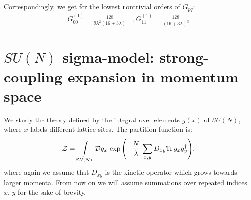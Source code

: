 \documentclass[twocolumn,showpacs,preprintnumbers,superscriptaddress,amsmath,floatfix,amssymb,secnumarabic]{revtex4}
\newcommand{\lr}[1]{ \left( #1 \right) }
\newcommand{\tr}{ {\rm Tr} \, }
\newcommand{\expa}[1]{ \exp{\left( #1 \right)} }
\begin{document}
Correspondingly, we get for the lowest nontrivial orders of $G_{pq}$:
\begin{eqnarray}
\label{G2_GW_perturb}
 G^{\lr{1}}_{00} = \frac{128}{9 \lambda^2 \lr{16 + 3 \lambda}}
 \quad,
 G^{\lr{1}}_{11} = \frac{128}{\lr{16 + 3 \lambda}^3}
\end{eqnarray}

\section*{$SU\lr{N}$ sigma-model: strong-coupling expansion in momentum space}
\label{sec:introduction}

 We study the theory defined by the integral over elements $g\lr{x}$ of $SU\lr{N}$, where $x$ labels different lattice sites. The partition function is:
\begin{eqnarray}
\label{pf_def}
\mathcal{Z} = \int\limits_{SU\lr{N}} \mathcal{D} g_x \,
\expa{-\frac{N}{\lambda}\, \sum \limits_{x,y} D_{xy} \tr g_x g^{\dag}_y } ,
\end{eqnarray}
where again we assume that $D_{xy}$ is the kinetic operator which grows towards larger momenta. From now on we will assume summations over repeated indices $x$, $y$ for the sake of brevity.
\end{document}
